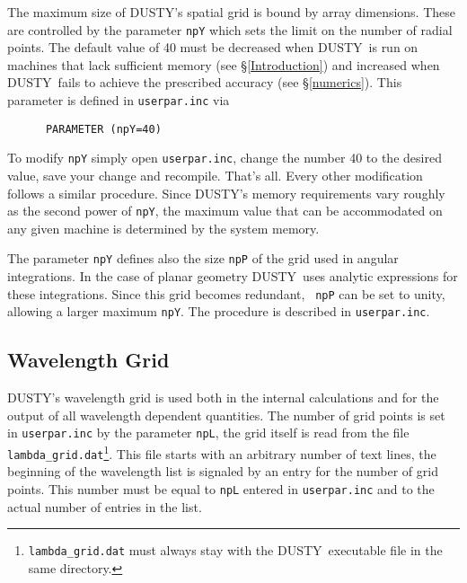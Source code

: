\documentclass[12pt]{article} \usepackage{epsf}
\def\D  {{\sf DUSTY}}
\begin{document}
The maximum size of \D's spatial grid is bound by array dimensions. These are
controlled by the parameter {\tt npY} which sets the limit on the number of
radial points.  The default value of 40 must be decreased when \D\ is run on
machines that lack sufficient memory (see \S\ref{Introduction}) and increased
when \D\ fails to achieve the prescribed accuracy (see \S\ref{numerics}). This
parameter is defined in {\tt userpar.inc} via
\begin{verbatim}
      PARAMETER (npY=40)
\end{verbatim}
To modify {\tt npY} simply open {\tt userpar.inc}, change the number 40 to the
desired value, save your change and recompile.  That's all.  Every other
modification follows a similar procedure. Since \D's memory requirements vary
roughly as the second power of {\tt npY}, the maximum value that can be
accommodated on any given machine is determined by the system memory.

The parameter {\tt npY} defines also the size {\tt npP} of the grid used in
angular integrations.  In the case of planar geometry \D\ uses analytic
expressions for these integrations.  Since this grid becomes redundant, {\tt
npP} can be set to unity, allowing a larger maximum {\tt npY}.  The procedure
is described in {\tt userpar.inc}.

\subsection{Wavelength Grid} \label{F-Grid}

\D's wavelength grid is used both in the internal calculations and for the
output of all wavelength dependent quantities. The number of grid points is set
in {\tt userpar.inc} by the parameter {\tt npL}, the grid itself is read from
the file {\tt lambda\_grid.dat}\footnote{{\tt lambda\_grid.dat} must always
stay with the \D\ executable file in the same directory.}. This file starts
with an arbitrary number of text lines, the beginning of the wavelength list is
signaled by an entry for the number of grid points.  This number must be equal
to {\tt npL} entered in {\tt userpar.inc} and to the actual number of entries
in the list.
\end{document}
